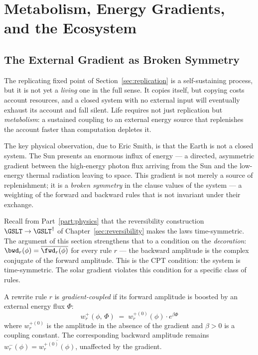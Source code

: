 \chapter{Metabolism, Energy Gradients, and the Ecosystem}
\label{sec:metabolism}

\section{The External Gradient as Broken Symmetry}

The replicating fixed point of Section~\ref{sec:replication} is a
self-sustaining process, but it is not yet a \emph{living} one in
the full sense.
It copies itself, but copying costs account resources, and a closed
system with no external input will eventually exhaust its account and
fall silent.
Life requires not just replication but \emph{metabolism}: a
sustained coupling to an external energy source that replenishes
the account faster than computation depletes it.

The key physical observation, due to Eric Smith, is that the
Earth is not a closed system.
The Sun presents an enormous influx of energy --- a directed,
asymmetric gradient between the high-energy photon flux arriving
from the Sun and the low-energy thermal radiation leaving to space.
This gradient is not merely a source of replenishment; it is a
\emph{broken symmetry} in the clause values of the system --- a weighting of
the forward and backward rules that is not invariant under their exchange.

Recall from Part~\ref{part:physics} that the reversibility construction
$\GSLT \to \GSLT^\dagger$ of Chapter~\ref{sec:reversibility} makes the laws
time-symmetric.  The argument of this section strengthens that to a condition on
the \emph{decoration}: $\bwd_r(\phi) = \overline{\fwd_r(\phi)}$ for every rule
$r$ --- the backward amplitude is the complex conjugate of the forward
amplitude.
This is the CPT condition: the system is time-symmetric.
The solar gradient violates this condition for a specific class
of rules.

\begin{definition}
A rewrite rule $r$ is \emph{gradient-coupled} if its forward
amplitude is boosted by an external energy flux $\Phi$:
\[
  w^+_r(\phi,\, \Phi) \;=\; w^{+(0)}_r(\phi) \cdot e^{\beta\Phi}
\]
where $w^{+(0)}_r$ is the amplitude in the absence of the
gradient and $\beta > 0$ is a coupling constant.
The corresponding backward amplitude remains
$w^-_r(\phi) = \overline{w^{+(0)}_r(\phi)}$, unaffected by the
gradient.
\end{definition}

